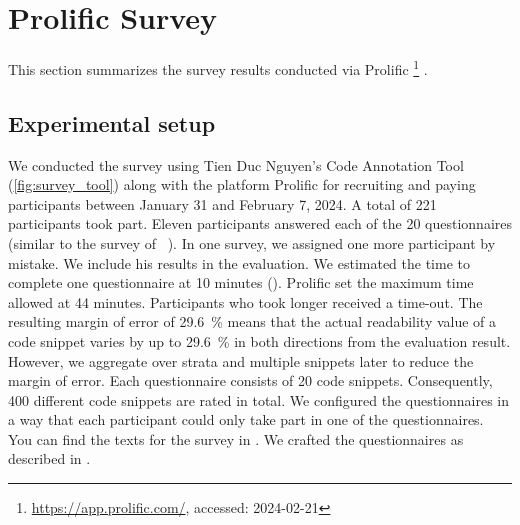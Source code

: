 \documentclass[%
class=scrreprt,
chapterprefix=false,%
open=right,%
twoside=true,%
paper=a4,%
logofile={Logo\_zentral\_farbig\_EN.png},%
thesistype=master,%
UKenglish,%
]{se2thesis}
\newcounter{urlfootnote}
\newcommand{\onecurl}[2]{%
	\stepcounter{urlfootnote}%
	\expandafter\def\csname urlfootnote:#1\endcsname{\theurlfootnote}%
	\footnote{\label{url:#1}\url{#1}, accessed: #2}%
}
\newcommand{\curl}[2]{%
		\onecurl{#1}{#2}%
}
\theoremstyle{definition}
\begin{document}
\section{Prolific Survey} \label{Prolific Survey}
	This section summarizes the survey results conducted via Prolific\curl{https://app.prolific.com/}{2024-02-21}.
		
\subsection{Experimental setup}
	We conducted the survey using Tien Duc Nguyen's Code Annotation Tool (\autoref{fig:survey_tool}) along with the platform Prolific for recruiting and paying participants between January 31 and February 7, 2024. A total of 221 participants took part. Eleven participants answered each of the 20 questionnaires (similar to the survey of \citeauthor{scalabrino2018comprehensive}~\cite{scalabrino2018comprehensive}). In one survey, we assigned one more participant by mistake. We include his results in the evaluation. We estimated the time to complete one questionnaire at 10 minutes (). Prolific set the maximum time allowed at 44 minutes. Participants who took longer received a time-out.
	The resulting margin of error of 29.6~\% means that the actual readability value of a code snippet varies by up to 29.6~\% in both directions from the evaluation result.
	However, we aggregate over strata and multiple snippets later to reduce the margin of error.
	Each questionnaire consists of 20 code snippets. Consequently, 400 different code snippets are rated in total. We configured the questionnaires in a way that each participant could only take part in one of the questionnaires. You can find the texts for the survey in . We crafted the questionnaires as described in .
		
\end{document}
